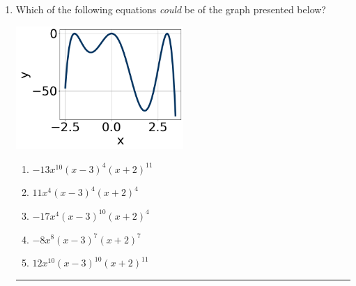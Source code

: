 \documentclass[14pt]{extbook}
\newcommand{\litem}[1]{\item#1\hspace*{-1cm}\rule{\textwidth}{0.4pt}}
\begin{document}
\begin{enumerate}
{\begin{enumerate}[label=\Alph*.]
\end{enumerate} }
\litem{
Which of the following equations \textit{could} be of the graph presented below?
\begin{center}
    \includegraphics[width=0.5\textwidth]{../Figures/polyGraphToFunctionC.png}
\end{center}
\begin{enumerate}[label=\Alph*.]
\item \( -13x^{10} (x - 3)^{4} (x + 2)^{11} \)
\item \( 11x^{4} (x - 3)^{4} (x + 2)^{4} \)
\item \( -17x^{4} (x - 3)^{10} (x + 2)^{4} \)
\item \( -8x^{8} (x - 3)^{7} (x + 2)^{7} \)
\item \( 12x^{10} (x - 3)^{10} (x + 2)^{11} \)


\end{enumerate}}
\end{enumerate}
\end{document}
